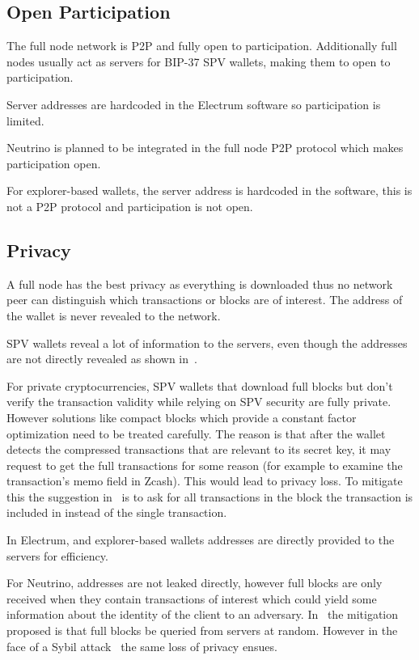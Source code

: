 \subsection{Open Participation}
The full node network is P2P and fully open to participation.  Additionally full nodes usually act as servers for BIP-37 SPV wallets, making them to open to participation.

Server addresses are hardcoded in the Electrum software so participation is limited.

Neutrino is planned to be integrated in the full node P2P protocol which makes participation open.

For explorer-based wallets, the server address is hardcoded in the software, this is not a P2P protocol and participation is not open.

\subsection{Privacy}
A full node has the best privacy as everything is downloaded thus no network peer can distinguish which transactions or blocks are of interest. The address of the wallet is never revealed to the network. 

SPV wallets reveal a lot of information to the servers, even though the addresses are not directly revealed as shown in~\cite{gervais2014privacy}.

For private cryptocurrencies, SPV wallets that download full blocks but don't verify the transaction validity while relying on SPV security are fully private. However solutions like compact blocks which provide a constant factor optimization need to be treated carefully. The reason is that after the wallet detects the compressed transactions that are relevant to its secret key, it may request to get the full transactions for some reason (for example to examine the transaction's memo field in Zcash). This would lead to privacy loss. To mitigate this the suggestion in~\cite{compact-blocks} is to ask for all transactions in the block the transaction is included in instead of the single transaction.

In Electrum, and explorer-based wallets addresses are directly provided to the servers for efficiency.

For Neutrino, addresses are not leaked directly, however full blocks are only received when they contain transactions of interest which could yield some information about the identity of the client to an adversary. In~\cite{bip157} the mitigation proposed is that full blocks be queried from servers at random. However in the face of a Sybil attack~\cite{sybil} the same loss of privacy ensues.

